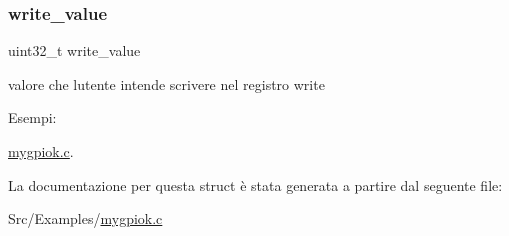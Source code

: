 \subsubsection{\texorpdfstring{write\+\_\+value}{write\_value}}
{\footnotesize\ttfamily uint32\+\_\+t write\+\_\+value}



valore che l\textquotesingle{}utente intende scrivere nel registro write 

\begin{Desc}
\item[Esempi\+: ]\par
\hyperlink{mygpiok_8c-example}{mygpiok.\+c}.\end{Desc}


La documentazione per questa struct è stata generata a partire dal seguente file\+:\begin{DoxyCompactItemize}
\item 
Src/\+Examples/\hyperlink{mygpiok_8c}{mygpiok.\+c}\end{DoxyCompactItemize}
